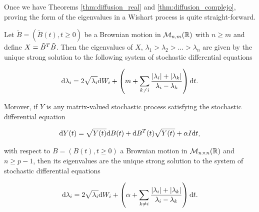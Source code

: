 Once we have Theorems \ref{thm:diffusion_real} and \ref{thm:diffusion_complejo}, proving the form of the eigenvalues in a Wishart process is quite straight-forward.



\begin{corollary}
    Let $\tilde B = (\tilde B(t), t\ge 0)$ be a Brownian motion in $\mathcal M_{n,m}(\mathbb R)$ with $n\ge m$ and define $X = \tilde B^T\tilde B$. Then the eigenvalues of $X$, $\lambda_1 > \lambda_2 > ... > \lambda_n$ are given by the unique strong solution to the following system of stochastic differential equations

    \begin{equation*}
        \mathrm d \lambda_i = 2 \sqrt{\lambda_i} \mathrm d W_i + \left(m + \sum_{k\neq i} \frac{\lvert \lambda_i \rvert + \lvert \lambda_k \rvert}{ \lambda_i - \lambda_k} \right) \mathrm d t.
    \end{equation*}

    Morover, if $Y$ is any matrix-valued stochastic process satisfying the stochastic differential equation

    \begin{equation*}
        \mathrm d Y(t) = \sqrt{Y(t)} \mathrm d B(t) + \mathrm d B^T(t) \sqrt{Y(t)} + \alpha I \mathrm d t,
    \end{equation*}

    with respect to $B = (B(t), t \ge 0)$ a Brownian motion in $\mathcal M_{n\times n}(\mathbb R)$ and $n\ge p-1$, then its eigenvalues are the unique strong solution to the system of stochastic differential equations

    \begin{equation} \label{eq:wishart}
        \mathrm d \lambda_i = 2 \sqrt{\lambda_i} \mathrm d W_i + \left(\alpha + \sum_{k\neq i} \frac{\lvert \lambda_i \rvert + \lvert \lambda_k \rvert}{ \lambda_i - \lambda_k} \right) \mathrm d t.
    \end{equation}

\end{corollary}


